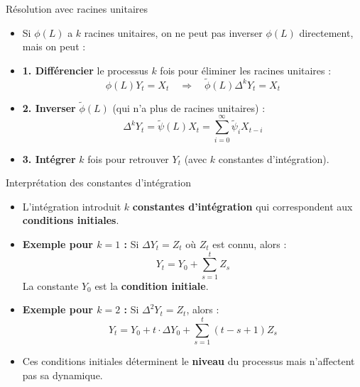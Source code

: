 \documentclass[11pt,aspectratio=169]{beamer}
\begin{document}
\begin{frame}{Résolution avec racines unitaires}

\begin{itemize}

\item Si $\phi(L)$ a $k$ racines unitaires, on ne peut pas inverser $\phi(L)$ directement, mais on peut :\newline

\item \textbf{1. Différencier} le processus $k$ fois pour éliminer les racines unitaires :
  \[
  \phi(L) Y_t = X_t \quad \Rightarrow \quad \tilde{\phi}(L) \Delta^k Y_t = X_t
  \]\newline

\item \textbf{2. Inverser} $\tilde{\phi}(L)$ (qui n'a plus de racines unitaires) :
  \[
  \Delta^k Y_t = \tilde{\psi}(L) X_t = \sum_{i=0}^{\infty} \tilde{\psi}_i X_{t-i}
  \]\newline

\item \textbf{3. Intégrer} $k$ fois pour retrouver $Y_t$ (avec $k$ constantes d'intégration).

\end{itemize}

\end{frame}

\begin{frame}{Interprétation des constantes d'intégration}

\begin{itemize}

\item L'intégration introduit $k$ \textbf{constantes d'intégration} qui correspondent aux \textbf{conditions initiales}.\newline

\item \textbf{Exemple pour $k=1$ :} Si $\Delta Y_t = Z_t$ où $Z_t$ est connu, alors :
  \[
  Y_t = Y_0 + \sum_{s=1}^{t} Z_s
  \]
  La constante $Y_0$ est la \textbf{condition initiale}.\newline

\item \textbf{Exemple pour $k=2$ :} Si $\Delta^2 Y_t = Z_t$, alors :
  \[
  Y_t = Y_0 + t \cdot \Delta Y_0 + \sum_{s=1}^{t} (t-s+1) Z_s
  \]\newline

\item Ces conditions initiales déterminent le \textbf{niveau} du processus mais n'affectent pas sa dynamique.

\end{itemize}

\end{frame}
\end{document}
